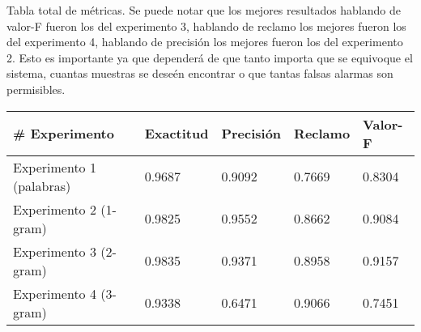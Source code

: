 
\caption{Tabla total de métricas. Se puede notar que los mejores resultados hablando de valor-F fueron los del experimento 3, hablando de reclamo los mejores fueron los del experimento 4, hablando de precisión los mejores fueron los del experimento 2. Esto es importante ya que dependerá de que tanto importa que se equivoque el sistema, cuantas muestras se deseén encontrar o que tantas falsas alarmas son permisibles.}
\begin{tabular}{|l|llll|}
\hline
\# Experimento & Exactitud &     Precisión &     Reclamo  &   Valor-F \\ \hline
Experimento 1 (palabras) &       0.9687  &       0.9092  &       0.7669  &       0.8304  \\ \hline
Experimento 2 (1-gram) &       0.9825  &       {\color{OliveGreen} 0.9552}  &       0.8662  &       0.9084  \\ \hline
Experimento 3 (2-gram) &       {\color{OliveGreen} 0.9835}  &       0.9371  &       0.8958  &       {\color{OliveGreen} 0.9157}  \\ \hline
Experimento 4 (3-gram) &       0.9338  &       0.6471  &      {\color{OliveGreen}  0.9066}  &       0.7451  \\ \hline
\end{tabular}
